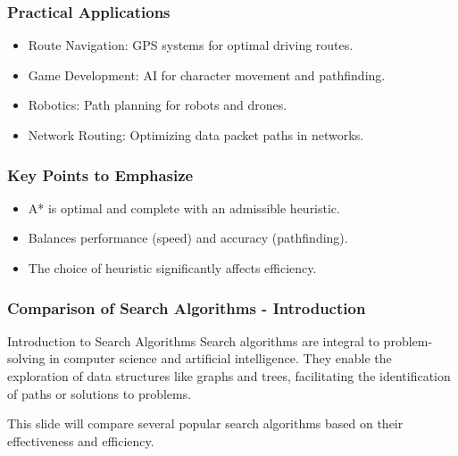 \documentclass[aspectratio=169]{beamer}
\begin{document}
\begin{frame}[fragile]
    \frametitle{Practical Applications}
    \begin{itemize}
        \item Route Navigation: GPS systems for optimal driving routes.
        \item Game Development: AI for character movement and pathfinding.
        \item Robotics: Path planning for robots and drones.
        \item Network Routing: Optimizing data packet paths in networks.
    \end{itemize}
\end{frame}

\begin{frame}[fragile]
    \frametitle{Key Points to Emphasize}
    \begin{itemize}
        \item A* is optimal and complete with an admissible heuristic.
        \item Balances performance (speed) and accuracy (pathfinding).
        \item The choice of heuristic significantly affects efficiency.
    \end{itemize}
\end{frame}

\begin{frame}[fragile]
    \frametitle{Comparison of Search Algorithms - Introduction}
    \begin{block}{Introduction to Search Algorithms}
        Search algorithms are integral to problem-solving in computer science and artificial intelligence. They enable the exploration of data structures like graphs and trees, facilitating the identification of paths or solutions to problems. 
    \end{block}
    This slide will compare several popular search algorithms based on their effectiveness and efficiency.
\end{frame}
\end{document}
